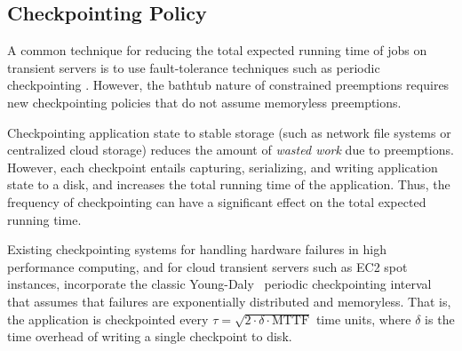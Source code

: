 
\begin{comment}
Our job scheduling policy uses the preemption model to determine the preemption probability of jobs of a given length $T$. 
Assume that the running VM's age (time since launch) is $s$. 
Then, the the probability of failure on the existing VM, $P_{\text{Existing}} = max(1, F(T+s) - F(T))$.  
The alternative is to discard the VM and launch a new VM, in which case, the failure probability is $P_{\text{New}} = F(T)$.
Depending on the VM's age $s$ and the job's running time $T$, we can compare $P_{\text{Existing}}$ and $P_{\text{New}}$, and run the job on whichever case yields the lower failure probability. 
\end{comment}



\vspace*{\subsecspace}
\subsection{Checkpointing Policy}


A common technique for reducing the total expected running time of jobs on transient servers is to use fault-tolerance techniques such as periodic checkpointing \cite{flint}.
%
However, the bathtub nature of constrained preemptions requires new checkpointing policies that do not assume memoryless preemptions. 


Checkpointing application state to stable storage (such as network file systems or centralized cloud storage) reduces the amount of \emph{wasted work} due to preemptions.
However, each checkpoint entails capturing, serializing, and writing application state to a disk, and increases the total running time of the application.
Thus, the frequency of checkpointing can have a significant effect on the total expected running time.

Existing checkpointing systems for handling hardware failures in high performance computing, and for cloud transient servers such as EC2 spot instances, incorporate the classic Young-Daly~\cite{dongarra_fault_nodate, daly2006higher, flint, marathe2014exploiting} periodic checkpointing interval that assumes that failures are exponentially distributed and memoryless.  
That is, the application is checkpointed every $\tau = \sqrt{2 \cdot \delta \cdot \text{MTTF}}$ time units, where $\delta$ is the time overhead of writing a single checkpoint to disk. 


